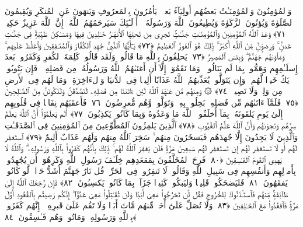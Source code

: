  وَٱلمُؤمِنُونَ وَٱلمُؤمِنَـٰتُ بَعضُهُم أَولِيَآءُ بَعضٍۢ ۚ يَأمُرُونَ بِٱلمَعرُوفِ وَيَنهَونَ عَنِ ٱلمُنكَرِ وَيُقِيمُونَ ٱلصَّلَوٰةَ وَيُؤتُونَ ٱلزَّكَوٰةَ وَيُطِيعُونَ ٱللَّهَ وَرَسُولَهُۥٓ ۚ أُو۟لَـٰٓئِكَ سَيَرحَمُهُمُ ٱللَّهُ ۗ إِنَّ ٱللَّهَ عَزِيزٌ حَكِيمٌۭ ﴿٧١﴾
 وَعَدَ ٱللَّهُ ٱلمُؤمِنِينَ وَٱلمُؤمِنَـٰتِ جَنَّـٰتٍۢ تَجرِى مِن تَحتِهَا ٱلأَنهَـٰرُ خَـٰلِدِينَ فِيهَا وَمَسَـٰكِنَ طَيِّبَةًۭ فِى جَنَّـٰتِ عَدنٍۢ ۚ وَرِضوَٟنٌۭ مِّنَ ٱللَّهِ أَكبَرُ ۚ ذَٟلِكَ هُوَ ٱلفَوزُ ٱلعَظِيمُ ﴿٧٢﴾
 يَـٰٓأَيُّهَا ٱلنَّبِىُّ جَٰهِدِ ٱلكُفَّارَ وَٱلمُنَـٰفِقِينَ وَٱغلُظ عَلَيهِم ۚ وَمَأوَىٰهُم جَهَنَّمُ ۖ وَبِئسَ ٱلمَصِيرُ ﴿٧٣﴾
 يَحلِفُونَ بِٱللَّهِ مَا قَالُوا۟ وَلَقَد قَالُوا۟ كَلِمَةَ ٱلكُفرِ وَكَفَرُوا۟ بَعدَ إِسلَـٰمِهِم وَهَمُّوا۟ بِمَا لَم يَنَالُوا۟ ۚ وَمَا نَقَمُوٓا۟ إِلَّآ أَن أَغنَىٰهُمُ ٱللَّهُ وَرَسُولُهُۥ مِن فَضلِهِۦ ۚ فَإِن يَتُوبُوا۟ يَكُ خَيرًۭا لَّهُم ۖ وَإِن يَتَوَلَّوا۟ يُعَذِّبهُمُ ٱللَّهُ عَذَابًا أَلِيمًۭا فِى ٱلدُّنيَا وَٱلءَاخِرَةِ ۚ وَمَا لَهُم فِى ٱلأَرضِ مِن وَلِىٍّۢ وَلَا نَصِيرٍۢ ﴿٧٤﴾
 ۞ وَمِنهُم مَّن عَـٰهَدَ ٱللَّهَ لَئِن ءَاتَىٰنَا مِن فَضلِهِۦ لَنَصَّدَّقَنَّ وَلَنَكُونَنَّ مِنَ ٱلصَّـٰلِحِينَ ﴿٧٥﴾
 فَلَمَّآ ءَاتَىٰهُم مِّن فَضلِهِۦ بَخِلُوا۟ بِهِۦ وَتَوَلَّوا۟ وَّهُم مُّعرِضُونَ ﴿٧٦﴾
 فَأَعقَبَهُم نِفَاقًۭا فِى قُلُوبِهِم إِلَىٰ يَومِ يَلقَونَهُۥ بِمَآ أَخلَفُوا۟ ٱللَّهَ مَا وَعَدُوهُ وَبِمَا كَانُوا۟ يَكذِبُونَ ﴿٧٧﴾
 أَلَم يَعلَمُوٓا۟ أَنَّ ٱللَّهَ يَعلَمُ سِرَّهُم وَنَجوَىٰهُم وَأَنَّ ٱللَّهَ عَلَّٰمُ ٱلغُيُوبِ ﴿٧٨﴾
 ٱلَّذِينَ يَلمِزُونَ ٱلمُطَّوِّعِينَ مِنَ ٱلمُؤمِنِينَ فِى ٱلصَّدَقَـٰتِ وَٱلَّذِينَ لَا يَجِدُونَ إِلَّا جُهدَهُم فَيَسخَرُونَ مِنهُم ۙ سَخِرَ ٱللَّهُ مِنهُم وَلَهُم عَذَابٌ أَلِيمٌ ﴿٧٩﴾
 ٱستَغفِر لَهُم أَو لَا تَستَغفِر لَهُم إِن تَستَغفِر لَهُم سَبعِينَ مَرَّةًۭ فَلَن يَغفِرَ ٱللَّهُ لَهُم ۚ ذَٟلِكَ بِأَنَّهُم كَفَرُوا۟ بِٱللَّهِ وَرَسُولِهِۦ ۗ وَٱللَّهُ لَا يَهدِى ٱلقَومَ ٱلفَـٰسِقِينَ ﴿٨٠﴾
 فَرِحَ ٱلمُخَلَّفُونَ بِمَقعَدِهِم خِلَـٰفَ رَسُولِ ٱللَّهِ وَكَرِهُوٓا۟ أَن يُجَٰهِدُوا۟ بِأَموَٟلِهِم وَأَنفُسِهِم فِى سَبِيلِ ٱللَّهِ وَقَالُوا۟ لَا تَنفِرُوا۟ فِى ٱلحَرِّ ۗ قُل نَارُ جَهَنَّمَ أَشَدُّ حَرًّۭا ۚ لَّو كَانُوا۟ يَفقَهُونَ ﴿٨١﴾
 فَليَضحَكُوا۟ قَلِيلًۭا وَليَبكُوا۟ كَثِيرًۭا جَزَآءًۢ بِمَا كَانُوا۟ يَكسِبُونَ ﴿٨٢﴾
 فَإِن رَّجَعَكَ ٱللَّهُ إِلَىٰ طَآئِفَةٍۢ مِّنهُم فَٱستَـٔذَنُوكَ لِلخُرُوجِ فَقُل لَّن تَخرُجُوا۟ مَعِىَ أَبَدًۭا وَلَن تُقَـٰتِلُوا۟ مَعِىَ عَدُوًّا ۖ إِنَّكُم رَضِيتُم بِٱلقُعُودِ أَوَّلَ مَرَّةٍۢ فَٱقعُدُوا۟ مَعَ ٱلخَـٰلِفِينَ ﴿٨٣﴾
 وَلَا تُصَلِّ عَلَىٰٓ أَحَدٍۢ مِّنهُم مَّاتَ أَبَدًۭا وَلَا تَقُم عَلَىٰ قَبرِهِۦٓ ۖ إِنَّهُم كَفَرُوا۟ بِٱللَّهِ وَرَسُولِهِۦ وَمَاتُوا۟ وَهُم فَـٰسِقُونَ ﴿٨٤﴾
